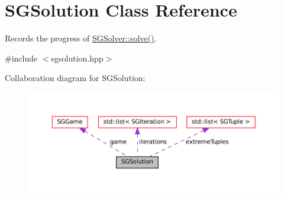 \hypertarget{classSGSolution}{}\section{S\+G\+Solution Class Reference}
\label{classSGSolution}


Records the progress of \hyperlink{classSGSolver_a220dd431eabdd9ff8419fafb28b7b990}{S\+G\+Solver\+::solve()}.  




{\ttfamily \#include $<$sgsolution.\+hpp$>$}



Collaboration diagram for S\+G\+Solution\+:
\nopagebreak
\begin{figure}[H]
\begin{center}
\leavevmode
\includegraphics[width=350pt]{classSGSolution__coll__graph}
\end{center}
\end{figure}
